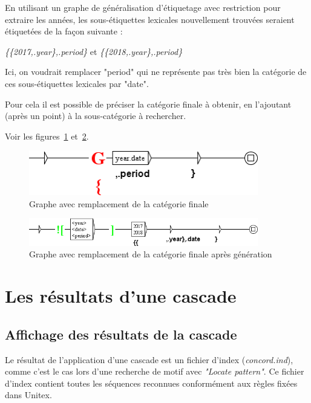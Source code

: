 \bigskip
En utilisant un graphe de généralisation d'étiquetage avec restriction pour extraire les années, les sous-étiquettes lexicales nouvellement trouvées seraient étiquetées de la façon suivante :


\emph{\{\{2017,.year\},.period\}} et \emph{\{\{2018,.year\},.period\}}

\bigskip
Ici, on voudrait remplacer "period" qui ne représente pas très bien la catégorie de ces sous-étiquettes lexicales par "date".


Pour cela il est possible de préciser la catégorie finale à obtenir, en l'ajoutant (après un point) à la sous-catégorie à rechercher.

\bigskip
Voir les figures~\ref{fig:graphe_remplacement} et~\ref{fig:graphe_remplacement_genere}.


\begin{figure}[!htb]
  \centering
  \includegraphics[width=10cm]{resources/img/graphe_remplacement.png}
  \caption{Graphe avec remplacement de la catégorie finale}
  \label{fig:graphe_remplacement}
\end{figure}

\begin{figure}[!htb]
  \centering
  \includegraphics[width=10cm]{resources/img/graphe_remplacement_genere.png}
  \caption{Graphe avec remplacement de la catégorie finale après génération}
  \label{fig:graphe_remplacement_genere}
\end{figure}

\section{Les résultats d'une cascade}

\subsection{Affichage des résultats de la cascade}
\label{subsec:resultsCascade}

Le résultat de l'application d'une cascade est un fichier d'index (\textit{concord.ind}), comme c'est le cas
lors d'une recherche de motif avec \textit{"Locate pattern"}. Ce fichier d'index contient toutes les séquences
reconnues conformément aux règles fixées dans Unitex.

